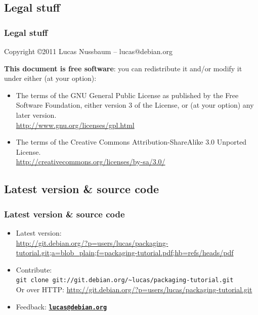 \documentclass[10pt,final]{beamer}
\begin{document}
\subsection{Legal stuff}
\begin{frame}
\frametitle{Legal stuff}

Copyright \copyright 2011 Lucas Nussbaum -- lucas@debian.org
\br

{\small 
\textbf{This document is free software}: you can redistribute it and/or modify
it under either (at your option):
\hbr
\begin{itemize}
\item The terms of the GNU General Public License as published by
    the Free Software Foundation, either version 3 of the License, or
    (at your option) any later version.\\
    \url{http://www.gnu.org/licenses/gpl.html}
    \br
\item The terms of the Creative Commons Attribution-ShareAlike 3.0 Unported License.\\
	\url{http://creativecommons.org/licenses/by-sa/3.0/}
\end{itemize}
}
\end{frame}

\subsection{Latest version \& source code}
\begin{frame}
\frametitle{Latest version \& source code}
\begin{itemize}
\item Latest version:\\
	{\footnotesize \url{http://git.debian.org/?p=users/lucas/packaging-tutorial.git;a=blob\_plain;f=packaging-tutorial.pdf;hb=refs/heads/pdf}}
\end{itemize}

\begin{itemize}
\item Contribute:\\
	\texttt{git clone git://git.debian.org/\~{}lucas/packaging-tutorial.git}\\
	\hbr
	Or over HTTP: \url{http://git.debian.org/?p=users/lucas/packaging-tutorial.git}
	\br
\item Feedback: \href{mailto:lucas@debian.org}{\textbf{\texttt{lucas@debian.org}}}
\end{itemize}
\end{frame}
\end{document}
